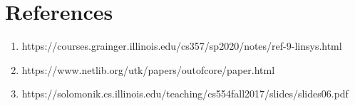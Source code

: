 \documentclass{article}
\begin{document}
\section{References}
\begin{enumerate}
	\item https://courses.grainger.illinois.edu/cs357/sp2020/notes/ref-9-linsys.html
	\item https://www.netlib.org/utk/papers/outofcore/paper.html
	\item https://solomonik.cs.illinois.edu/teaching/cs554\textunderscore fall2017/slides/slides\textup 06.pdf
\end{enumerate}
	
\end{document}
